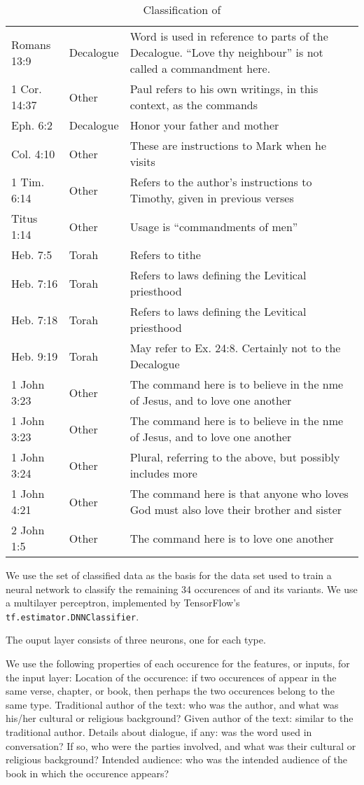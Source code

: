 \documentclass{article}
\newcommand{\entole}{\textepsilon\textnu\texttau\textomikron\textlambda\textepsilon\xspace}
\begin{document}
\begin{table}
\begin{tabularx}{\textwidth}{llX}
    Romans 13:9 & Decalogue & Word is used in reference to parts of the Decalogue.  ``Love thy neighbour'' is not called a commandment here.\\
    1 Cor. 14:37 & Other & Paul refers to his own writings, in this context, as the commands\\
    Eph. 6:2 & Decalogue & Honor your father and mother\\
    Col. 4:10 & Other & These are instructions to Mark when he visits\\
    1 Tim. 6:14 & Other & Refers to the author's instructions to Timothy, given in previous verses\\
    Titus 1:14 & Other & Usage is ``commandments of men''\\
    Heb. 7:5 & Torah & Refers to tithe\\
    Heb. 7:16 & Torah & Refers to laws defining the Levitical priesthood\\
    Heb. 7:18 & Torah & Refers to laws defining the Levitical priesthood\\
    Heb. 9:19 & Torah & May refer to Ex. 24:8.  Certainly not to the Decalogue\\
    1 John 3:23 & Other & The command here is to believe in the nme of Jesus, and to love one another\\
    1 John 3:23 & Other & The command here is to believe in the nme of Jesus, and to love one another\\
    1 John 3:24 & Other & Plural, referring to the above, but possibly includes more\\
    1 John 4:21 & Other & The command here is that anyone who loves God must also love their brother and sister\\
    2 John 1:5 & Other & The command here is to love one another\\
    \bottomrule
\end{tabularx}
    \caption{Classification of \entole}
    \label{training}
\end{table}

We use the set of classified data as the basis for the data set used to train a neural network to classify the remaining 34
occurences of \entole and its variants.  
We use a multilayer perceptron, implemented by TensorFlow's \texttt{tf.estimator.DNNClassifier}.

The ouput layer consists of three neurons, one for each type.

We use the following properties of each occurence for the features, or inputs, for the input layer:
Location of the occurence: if two occurences of \entole appear in the same verse, chapter, or book,
then perhaps the two occurences belong to the same type.  Traditional author of the text: who was
the author, and what was his/her cultural or religious background?  Given author of the text: similar
to the traditional author.  Details about dialogue, if any: was the word used in conversation?  If so,
who were the parties involved, and what was their cultural or religious background?  Intended audience:
who was the intended audience of the book in which the occurence appears?
\end{document}
